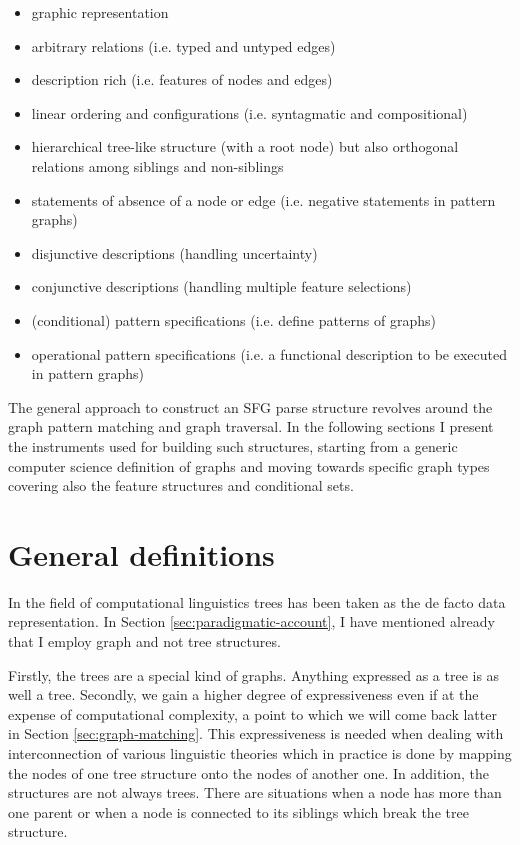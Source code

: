 \begin{itemize}
	\item graphic representation 
    \item arbitrary relations (i.e. typed and untyped edges)
	\item description rich (i.e. features of nodes and edges)
	\item linear ordering and configurations (i.e. syntagmatic and compositional)
	\item hierarchical tree-like structure (with a root node) but also orthogonal relations among siblings and non-siblings
	\item statements of absence of a node or edge (i.e. negative statements in pattern graphs)
	\item disjunctive descriptions (handling uncertainty)
	\item conjunctive descriptions (handling multiple feature selections)
	\item (conditional) pattern specifications (i.e. define patterns of graphs)
	\item operational pattern specifications (i.e. a functional description to be executed in pattern graphs)
\end{itemize}

The general approach to construct an SFG parse structure revolves around the graph pattern matching and graph traversal. In the following sections I present the instruments used for building such structures, starting from a generic computer science definition of graphs and moving towards specific graph types covering also the feature structures and conditional sets. 

\section{General definitions}
\label{sec:graphs}

In the field of computational linguistics trees has been taken as the de facto data representation. In Section \ref{sec:paradigmatic-account}, I have mentioned already that I employ graph and not tree structures. 

Firstly, the trees are a special kind of graphs. Anything expressed as a tree is as well a tree. Secondly, we gain a higher degree of expressiveness even if at the expense of computational complexity, a point to which we will come back latter in Section \ref{sec:graph-matching}. This expressiveness is needed when dealing with interconnection of various linguistic theories which in practice is done by mapping the nodes of one tree structure onto the nodes of another one. In addition, the structures are not always trees. There are situations when a node has more than one parent or when a node is connected to its siblings which break the tree structure. 

